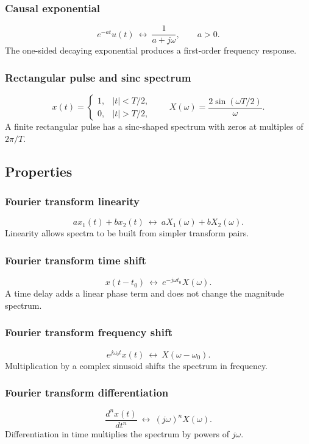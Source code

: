 \subsubsection{Causal exponential}
\[
e^{-at}u(t)\ \longleftrightarrow\ \frac{1}{a+j\omega},\qquad a>0.
\]
The one-sided decaying exponential produces a first-order frequency response.

\subsubsection{Rectangular pulse and sinc spectrum}
\[
x(t)=
\begin{cases}
1, & |t|<T/2,\\
0, & |t|>T/2,
\end{cases}
\qquad
X(\omega)=\frac{2\sin(\omega T/2)}{\omega}.
\]
A finite rectangular pulse has a sinc-shaped spectrum with zeros at multiples of \(2\pi/T\).

\subsection{Properties}

\subsubsection{Fourier transform linearity}
\[
a x_1(t)+b x_2(t)\ \longleftrightarrow\ aX_1(\omega)+bX_2(\omega).
\]
Linearity allows spectra to be built from simpler transform pairs.

\subsubsection{Fourier transform time shift}
\[
x(t-t_0)\ \longleftrightarrow\ e^{-j\omega t_0}X(\omega).
\]
A time delay adds a linear phase term and does not change the magnitude spectrum.

\subsubsection{Fourier transform frequency shift}
\[
e^{j\omega_0t}x(t)\ \longleftrightarrow\ X(\omega-\omega_0).
\]
Multiplication by a complex sinusoid shifts the spectrum in frequency.

\subsubsection{Fourier transform differentiation}
\[
\frac{d^n x(t)}{dt^n}\ \longleftrightarrow\ (j\omega)^n X(\omega).
\]
Differentiation in time multiplies the spectrum by powers of \(j\omega\).

